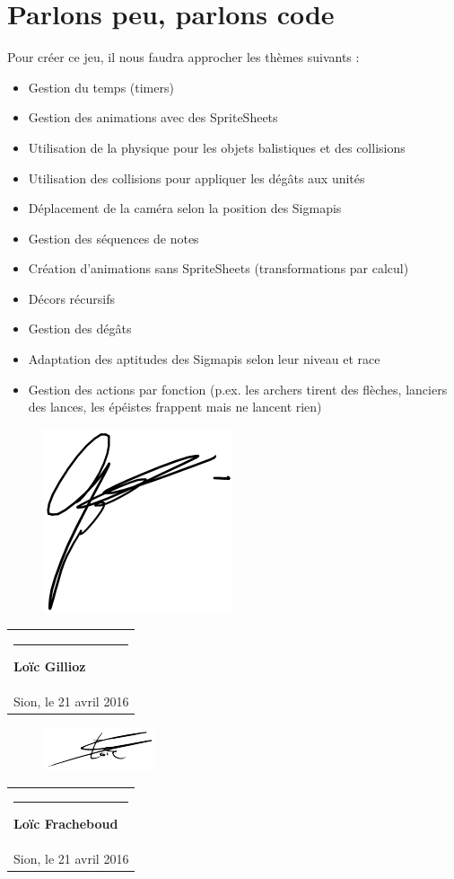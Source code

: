 \documentclass[a4paper , 10pt]{article}
\newcommand{\signature}[2]{%
 \par\nobreak\bigskip
 \begin{singlespace}%
 \mbox{}\hfill\begin{tabular}{p{8cm} }
     \rule{8cm}{0.5pt}\newline{}%
       \textbf{#1}\\%
      #2 %
 \end{tabular}%
 \end{singlespace}%
 \medskip%
}
\begin{document}
\section{Parlons peu, parlons code}
Pour créer ce jeu, il nous faudra approcher les thèmes suivants :
\begin{itemize}
\item Gestion du temps (timers)
\item Gestion des animations avec des SpriteSheets
\item Utilisation de la physique pour les objets balistiques et des collisions
\item Utilisation des collisions pour appliquer les dégâts aux unités
\item Déplacement de la caméra selon la position des Sigmapis
\item Gestion des séquences de notes 
\item Création d'animations sans SpriteSheets (transformations par calcul)
\item Décors récursifs
\item Gestion des dégâts
\item Adaptation des aptitudes des Sigmapis selon leur niveau et race
\item Gestion des actions par fonction (p.ex. les archers tirent des flèches, lanciers des lances, les épéistes frappent mais ne lancent rien)
\end{itemize}


\vspace{30pt}
\begin{figure}
\vspace{-52pt}
\centering
\includegraphics[scale=0.5]{signgillioz}
\end{figure}
\signature{Loïc Gillioz}{Sion, le 21 avril 2016} 

\begin{figure}
\vspace{-52pt}
\centering
\includegraphics[scale=1]{signfracheboud}
\end{figure}
\signature{Loïc Fracheboud}{Sion, le 21 avril 2016} 
\end{document}
